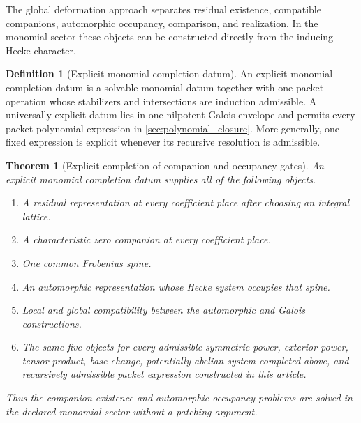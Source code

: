 \documentclass{aomart}
\newtheorem{theorem}{Theorem}[section]
\theoremstyle{definition}
\newtheorem{definition}[definition]{Definition}
\theoremstyle{remark}
\begin{document}
The global deformation approach separates residual existence, compatible companions, automorphic occupancy, comparison, and realization. In the monomial sector these objects can be constructed directly from the inducing Hecke character.

\begin{definition}[Explicit monomial completion datum]\label{def:explicit_completion}
An explicit monomial completion datum is a solvable monomial datum together with one packet operation whose stabilizers and intersections are induction admissible. A universally explicit datum lies in one nilpotent Galois envelope and permits every packet polynomial expression in \cref{sec:polynomial_closure}. More generally, one fixed expression is explicit whenever its recursive resolution is admissible.
\end{definition}

\begin{theorem}[Explicit completion of companion and occupancy gates]\label{thm:explicit_gate_completion}
An explicit monomial completion datum supplies all of the following objects.

\begin{enumerate}
\item A residual representation at every coefficient place after choosing an integral lattice.
\item A characteristic zero companion at every coefficient place.
\item One common Frobenius spine.
\item An automorphic representation whose Hecke system occupies that spine.
\item Local and global compatibility between the automorphic and Galois constructions.
\item The same five objects for every admissible symmetric power, exterior power, tensor product, base change, potentially abelian system completed above, and recursively admissible packet expression constructed in this article.
\end{enumerate}

Thus the companion existence and automorphic occupancy problems are solved in the declared monomial sector without a patching argument.
\end{theorem}
\end{document}
